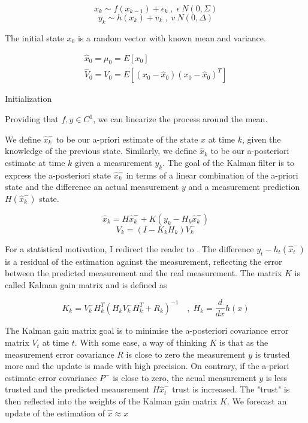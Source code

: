 \documentclass[mscthesis]{usiinfthesis}
\begin{document}
\[
x_k \sim f(x_{k-1}) + \epsilon_k \; , \; \epsilon ~ N(0, \Sigma)
\]
\[
y_k \sim h(x_{k}) + v_{k} \; , \; v ~ N(0, \Delta)
\]

The initial state $x_0$ is a random vector with known mean and variance.

\begin{eqfloat}
\begin{equation}
\begin{array}{l}
\hat{x}_0 = \mu_0 = E[x_0] \\
\hat{V}_0 = V_0 = E[(x_0-\hat{x}_0)(x_0-\hat{x}_0)^T] 
\end{array}
\label{eq:kalman_init}
\end{equation}
\caption{Initialization}
\end{eqfloat}

Providing that $f, y \in C^1$, we can linearize the process around the mean. 


We define $\hat{x}_k^-$ to be our a-priori estimate of the state $x$ at time $k$, given the knowledge of the previous state. Similarly, we define $\hat{x}_k$ to be our a-posteriori estimate at time $k$ given a measurement $y_k$. The goal of the Kalman filter is to express the a-posteriori state $\hat{x}_k^-$ in terms of a linear combination of the a-priori state and the difference an actual measurement $y$ and a measurement prediction $H(\hat{x}_k^-)$ state. 

\[
\hat{x}_k = H\hat{x}_k^- + K (y_k - H_k \hat{x}_k^-)
\]
\[
V_k = (I-K_k H_k)V_k^-
\]


For a statistical motivation, I redirect the reader to \citet{paper:Maybeck79}. The difference $y_t - h_t(\hat{x}_t^-)$ is a residual of the estimation against the measurement, reflecting the error between the predicted measurement and the real measurement. The matrix $K$ is called Kalman gain matrix and is defined as 

\[
K_k = V_k^- H^T_k (H_k V_k^- H^T_k + R_k)^{-1}  \quad , \; H_k = \frac{d}{dx} h(x)
\]

The Kalman gain matrix goal is to minimise the a-posteriori covariance error matrix $V_t$ at time $t$. With some ease, a way of thinking $K$ is that as the measurement error covariance $R$ is close to zero the measurement $y$ is trusted more and the update is made with high precision. On contrary, if the a-priori estimate error covariance $P^-$ is close to zero, the acual measurement $y$ is less trusted and the predicted meausrement $H\hat{x}_t^-$ trust is increased. The "trust" is then reflected into the weights of the Kalman gain matrix $K$. We forecast an update of the estimation of $\hat{x} \approx x$
\end{document}
